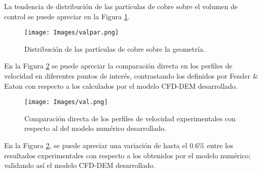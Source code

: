 \noindent
\justify

La tendencia de distribuci\'on de las part\'iculas de cobre sobre el volumen de control se puede apreciar en la Figura \ref{valten}.

\begin{figure}[h!]
	\centering
	\texttt{[image: Images/valpar.png]}
	\caption{Distribuci\'on de las part\'iculas de cobre sobre la geometr\'ia.}
	\label{valten}
\end{figure}

\noindent
\justify

En la Figura \ref{valcompa} se puede apreciar la comparaci\'on directa en los perfiles de velocidad en diferentes puntos de inter\'es, contrastando los definidos por Fessler \& Eaton con respecto a los calculados por el modelo CFD-DEM desarrollado.

\begin{figure}[h!]
	\centering
	\texttt{[image: Images/val.png]}
	\caption{Comparaci\'on directa de los perfiles de velocidad experimentales con respecto al del modelo num\'erico desarrollado.}
	\label{valcompa}
\end{figure}

\noindent
\justify

En la Figura \ref{valcompa}, se puede apreciar una variaci\'on de hasta el $0.6\%$  entre los resultados experimentales con respecto a los obtenidos por el modelo num\'erico; validando as\'i el modelo CFD-DEM desarrollado.
